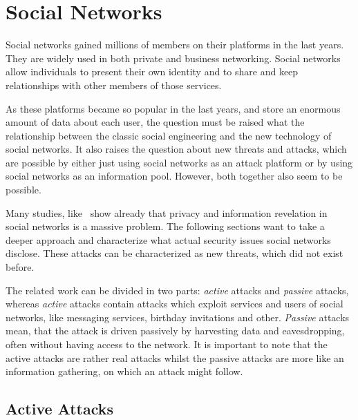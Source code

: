 \section{Social Networks}

Social networks gained millions of members on their platforms in the last years.
They are widely used in both private and business networking. Social networks
allow individuals to present their own identity and to share and keep
relationships with other members of those services.

As these platforms became so popular in the last years, and store an enormous
amount of data about each user, the question must be raised what the
relationship between the classic social engineering and the new technology of
social networks. It also raises the question about new threats and attacks,
which are possible by either just using social networks as an attack platform
or by using social networks as an information pool. However, both together also
seem to be possible.

Many studies, like~\cite{fraunhofer2008,gross2005} show already that privacy
and information revelation in social networks is a massive problem. The following
sections want to take a deeper approach and characterize what actual security
issues social networks disclose. These attacks can be characterized as new
threats, which did not exist before. 

The related work can be divided in two parts: \textit{active} attacks and
\textit{passive} attacks, whereas \textit{active} attacks contain attacks
which exploit services and users of social networks, like messaging services,
birthday invitations and other. \textit{Passive} attacks mean, that the attack
is driven passively by harvesting data and eavesdropping, often without having
access to the network. It is important to note that the active attacks are
rather real attacks whilst the passive attacks are more like an information
gathering, on which an attack might follow.

\subsection{Active Attacks}
\label{subsection:active_attacks}

